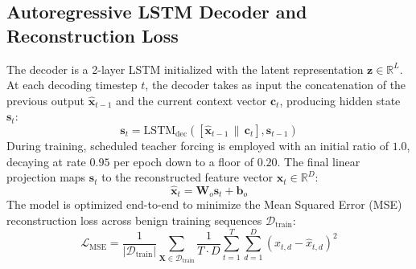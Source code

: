 \documentclass[twocolumn]{article}
\begin{document}
\subsection{Autoregressive LSTM Decoder and Reconstruction Loss}
The decoder is a 2-layer LSTM initialized with the latent representation $\mathbf{z} \in \mathbb{R}^L$. At each decoding timestep $t$, the decoder takes as input the concatenation of the previous output $\hat{\mathbf{x}}_{t-1}$ and the current context vector $\mathbf{c}_t$, producing hidden state $\mathbf{s}_t$:
\begin{equation}
    \mathbf{s}_t = \text{LSTM}_{\text{dec}}([\hat{\mathbf{x}}_{t-1} \,\|\, \mathbf{c}_t], \mathbf{s}_{t-1})
\end{equation}
During training, scheduled teacher forcing is employed with an initial ratio of $1.0$, decaying at rate $0.95$ per epoch down to a floor of $0.20$. The final linear projection maps $\mathbf{s}_t$ to the reconstructed feature vector $\hat{\mathbf{x}}_t \in \mathbb{R}^D$:
\begin{equation}
    \hat{\mathbf{x}}_t = \mathbf{W}_o \mathbf{s}_t + \mathbf{b}_o
\end{equation}
The model is optimized end-to-end to minimize the Mean Squared Error (MSE) reconstruction loss across benign training sequences $\mathcal{D}_{\text{train}}$:
\begin{equation}
    \mathcal{L}_{\text{MSE}} = \frac{1}{|\mathcal{D}_{\text{train}}|} \sum_{\mathbf{X} \in \mathcal{D}_{\text{train}}} \frac{1}{T \cdot D} \sum_{t=1}^T \sum_{d=1}^D (x_{t,d} - \hat{x}_{t,d})^2
\end{equation}
\end{document}
